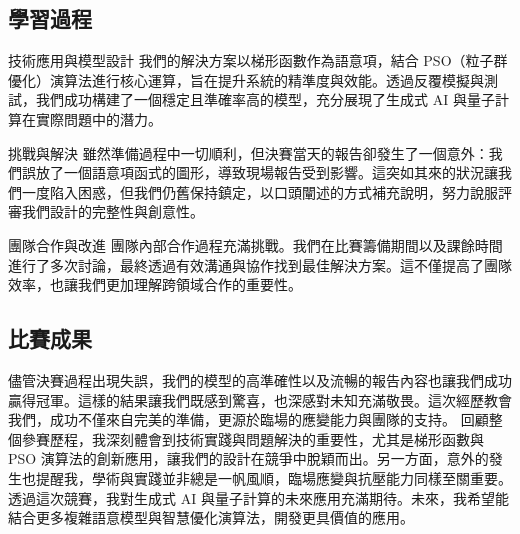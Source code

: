 \subsection{學習過程}

    技術應用與模型設計
    我們的解決方案以梯形函數作為語意項，結合 PSO（粒子群優化）演算法進行核心運算，旨在提升系統的精準度與效能。透過反覆模擬與測試，我們成功構建了一個穩定且準確率高的模型，充分展現了生成式 AI 與量子計算在實際問題中的潛力。

    挑戰與解決
    雖然準備過程中一切順利，但決賽當天的報告卻發生了一個意外：我們誤放了一個語意項函式的圖形，導致現場報告受到影響。這突如其來的狀況讓我們一度陷入困惑，但我們仍舊保持鎮定，以口頭闡述的方式補充說明，努力說服評審我們設計的完整性與創意性。

    團隊合作與改進
    團隊內部合作過程充滿挑戰。我們在比賽籌備期間以及課餘時間進行了多次討論，最終透過有效溝通與協作找到最佳解決方案。這不僅提高了團隊效率，也讓我們更加理解跨領域合作的重要性。

\subsection{比賽成果}

儘管決賽過程出現失誤，我們的模型的高準確性以及流暢的報告內容也讓我們成功贏得冠軍。這樣的結果讓我們既感到驚喜，也深感對未知充滿敬畏。這次經歷教會我們，成功不僅來自完美的準備，更源於臨場的應變能力與團隊的支持。
回顧整個參賽歷程，我深刻體會到技術實踐與問題解決的重要性，尤其是梯形函數與 PSO 演算法的創新應用，讓我們的設計在競爭中脫穎而出。另一方面，意外的發生也提醒我，學術與實踐並非總是一帆風順，臨場應變與抗壓能力同樣至關重要。
透過這次競賽，我對生成式 AI 與量子計算的未來應用充滿期待。未來，我希望能結合更多複雜語意模型與智慧優化演算法，開發更具價值的應用。
